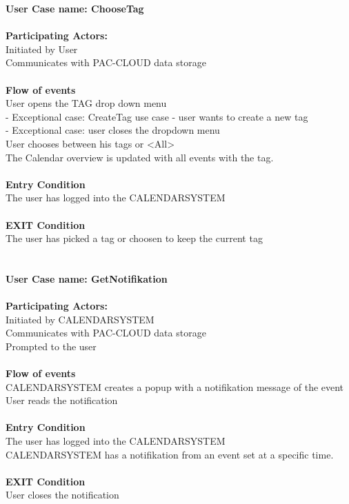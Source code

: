 \textbf{User Case name: ChooseTag}\\
\HRule \\[0.4cm]
\textbf{Participating Actors:}\\
Initiated by User\\
Communicates with PAC-CLOUD data storage\\
\HRule \\[0.4cm]
\textbf{Flow of events}\\
User opens the TAG drop down menu\\
 - Exceptional case: CreateTag use case - user wants to create a new tag\\
 - Exceptional case: user closes the dropdown menu\\
User chooses between his tags or <All>\\
The Calendar overview is updated with all events with the tag.\\
\HRule \\[0.4cm]
\textbf{Entry Condition}\\
The user has logged into the CALENDARSYSTEM\\
\HRule \\[0.4cm]
\textbf{EXIT Condition}\\
The user has picked a tag or choosen to keep the current tag\\\\\\
\textbf{User Case name: GetNotifikation}\\
\HRule \\[0.4cm]
\textbf{Participating Actors:}\\
Initiated by CALENDARSYSTEM\\
Communicates with PAC-CLOUD data storage\\
Prompted to the user\\
\HRule \\[0.4cm]
\textbf{Flow of events}\\
CALENDARSYSTEM creates a popup with a notifikation message of the event\\
User reads the notification\\
\HRule \\[0.4cm]
\textbf{Entry Condition}\\
The user has logged into the CALENDARSYSTEM\\
CALENDARSYSTEM has a notifikation from an event set at a specific time.\\
\HRule \\[0.4cm]
\textbf{EXIT Condition}\\
User closes the notification\\

\newpage